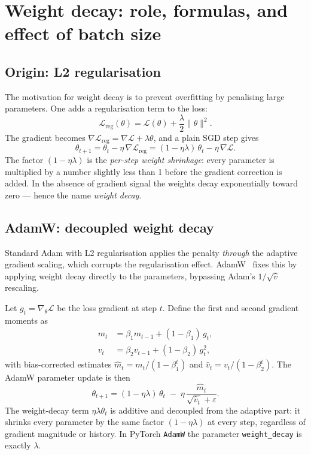 \documentclass[11pt]{article}
\begin{document}
\section{Weight decay: role, formulas, and effect of batch size}
\label{sec:weightdecay}

\subsection{Origin: L2 regularisation}

The motivation for weight decay is to prevent overfitting by penalising large
parameters.  One adds a regularisation term to the loss:
\begin{equation}
    \mathcal{L}_{\mathrm{reg}}(\theta)
    = \mathcal{L}(\theta) + \frac{\lambda}{2}\|\theta\|^2.
\end{equation}
The gradient becomes $\nabla\mathcal{L}_{\mathrm{reg}} = \nabla\mathcal{L} +
\lambda\theta$, and a plain SGD step gives
\begin{equation}
    \theta_{t+1}
    = \theta_t - \eta\,\nabla\mathcal{L}_{\mathrm{reg}}
    = (1-\eta\lambda)\,\theta_t - \eta\,\nabla\mathcal{L}.
    \label{eq:sgd-wd}
\end{equation}
The factor $(1-\eta\lambda)$ is the \emph{per-step weight shrinkage}: every
parameter is multiplied by a number slightly less than 1 before the gradient
correction is added.  In the absence of gradient signal the weights decay
exponentially toward zero --- hence the name \emph{weight decay}.

\subsection{AdamW: decoupled weight decay}

Standard Adam with L2 regularisation applies the penalty \emph{through} the
adaptive gradient scaling, which corrupts the regularisation effect.
AdamW~\citep{loshchilov2019} fixes this by applying weight decay directly to
the parameters, bypassing Adam's $1/\sqrt{\hat{v}}$ rescaling.

Let $g_t = \nabla_\theta\mathcal{L}$ be the loss gradient at step $t$.
Define the first and second gradient moments as
\begin{align}
    m_t &= \beta_1 m_{t-1} + (1-\beta_1)\,g_t, \\
    v_t &= \beta_2 v_{t-1} + (1-\beta_2)\,g_t^2,
\end{align}
with bias-corrected estimates
$\hat{m}_t = m_t/(1-\beta_1^t)$ and $\hat{v}_t = v_t/(1-\beta_2^t)$.
The AdamW parameter update is then
\begin{equation}
    \boxed{\theta_{t+1}
    = (1-\eta\lambda)\,\theta_t
    \;-\; \eta\,\frac{\hat{m}_t}{\sqrt{\hat{v}_t}+\varepsilon}.}
    \label{eq:adamw}
\end{equation}
The weight-decay term $\eta\lambda\theta_t$ is additive and decoupled from
the adaptive part: it shrinks every parameter by the same factor
$(1-\eta\lambda)$ at every step, regardless of gradient magnitude or history.
In PyTorch \texttt{AdamW} the parameter \texttt{weight\_decay} is exactly
$\lambda$.
\end{document}
